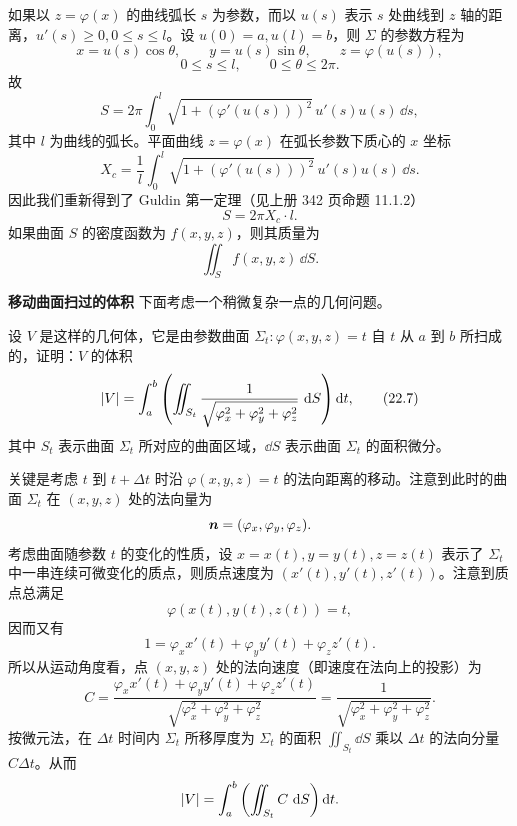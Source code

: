 \begin{xremark}
如果以 $z=\varphi(x)$ 的曲线弧长 $s$ 为参数，而以 $u(s)$ 表示 $s$ 处曲线到 $z$ 轴的距离，$u'(s)\ge0,0\le s\le l$。设 $u(0)=a,u(l)=b$，则 $\Sigma$ 的参数方程为
\[
  x=u(s)\cos\theta,\qquad y=u(s)\sin\theta,\qquad z=\varphi(u(s)),
\]
\[
  0\le s\le l,\qquad0\le\theta\le2\pi.
\]
故
\[
  S=2\pi\int_0^l\sqrt{1+(\varphi'(u(s)))^2}\,u'(s)u(s)\,\dd s,
\]
其中 $l$ 为曲线的弧长。平面曲线 $z=\varphi(x)$ 在弧长参数下质心的 $x$ 坐标
\[
  X_c=\frac1l\int_0^l\sqrt{1+(\varphi'(u(s)))^2}\,u'(s)u(s)\,\dd s.
\]
因此我们重新得到了 Guldin 第一定理（见上册 342 页命题 11.1.2）
\[
  S=2\pi X_c\cdot l.
\]
如果曲面 $S$ 的密度函数为 $f(x,y,z)$，则其质量为
\[
  \iint_S f(x,y,z)\,\dd S.
\]
\end{xremark}

\textbf{移动曲面扫过的体积}
下面考虑一个稍微复杂一点的几何问题。

\begin{xexample}[22.5.3]
设 $V$ 是这样的几何体，它是由参数曲面 $\Sigma_t\colon\varphi(x,y,z)=t$ 自 $t$ 从 $a$ 到 $b$ 所扫成的，证明：$V$ 的体积
\begin{equation}
  \lvert V\rvert=\int_a^b\left(\iint_{S_t}\frac1{\sqrt{\varphi_x^2+\varphi_y^2+\varphi_z^2}}\,\mathop{}\!\mathrm{d} S\right)\mathop{}\!\mathrm{d} t,
  \tag{22.7}
  \label{eq:22.7}
\end{equation}
其中 $S_t$ 表示曲面 $\Sigma_t$ 所对应的曲面区域，$\dd S$ 表示曲面 $\Sigma_t$ 的面积微分。
\end{xexample}
\begin{xproof}
关键是考虑 $t$ 到 $t+\Delta t$ 时沿 $\varphi(x,y,z)=t$ 的法向距离的移动。注意到此时的曲面 $\Sigma_t$ 在 $(x,y,z)$ 处的法向量为
\[
  \bm{n}=(\varphi_x,\varphi_y,\varphi_z).
\]
考虑曲面随参数 $t$ 的变化的性质，设 $x=x(t),y=y(t),z=z(t)$ 表示了 $\Sigma_t$ 中一串连续可微变化的质点，则质点速度为 $(x'(t),y'(t),z'(t))$。注意到质点总满足
\[
  \varphi(x(t),y(t),z(t))=t,
\]
因而又有
\[
  1=\varphi_xx'(t)+\varphi_yy'(t)+\varphi_zz'(t).
\]
所以从运动角度看，点 $(x,y,z)$ 处的法向速度（即速度在法向上的投影）为
\[
  C=\frac{\varphi_xx'(t)+\varphi_yy'(t)+\varphi_zz'(t)}{\sqrt{\varphi_x^2+\varphi_y^2+\varphi_z^2}}
  =\frac1{\sqrt{\varphi_x^2+\varphi_y^2+\varphi_z^2}}.
\]
按微元法，在 $\Delta t$ 时间内 $\Sigma_t$ 所移厚度为 $\Sigma_t$ 的面积 $\iint_{S_t}\dd S$ 乘以 $\Delta t$ 的法向分量 $C\Delta t$。从而
\[
  \lvert V\rvert=\int_a^b\left(\iint_{S_t}C\,\mathop{}\!\mathrm{d} S\right)\mathop{}\!\mathrm{d} t.
\]
\end{xproof}


